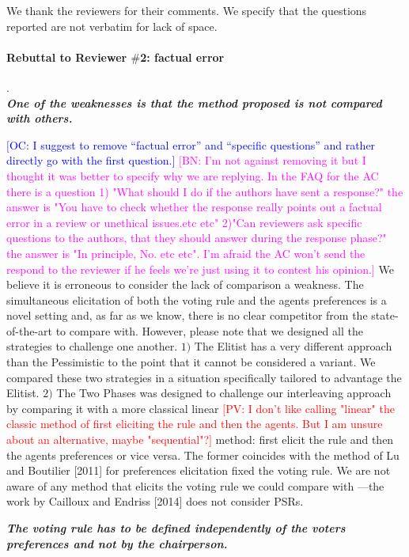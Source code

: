 \documentclass{article}
\newcommand{\commentOC}[1]{\textcolor{blue}{\small$\big[$OC: #1$\big]$}}
\newcommand{\commentBN}[1]{\textcolor{magenta}{\small$\big[$BN: #1$\big]$}}
\newcommand{\commentPV}[1]{\textcolor{red}{\small$\big[$PV: #1$\big]$}}
\begin{document}
\addtocounter{pagecount}{-4}

	We thank the reviewers for their comments. We specify that the questions reported are not verbatim for lack of space. 
\paragraph{Rebuttal to Reviewer $\#$2: factual error}.\\
\textit{\textbf{One of the weaknesses is that the method proposed is not compared with others.}}

\commentOC{I suggest to remove “factual error” and “specific questions” and rather directly go with the first question.} \commentBN{I'm not against removing it but I thought it was better to specify why we are replying. In the FAQ for the AC there is a question 1) "What should I do if the authors have sent a response?" the answer is "You have to check whether the response really points out a factual error in a review or unethical issues.etc etc" 2)"Can reviewers ask specific questions to the authors, that they should answer during the response phase?" the answer is "In principle, No. etc etc". I'm afraid the AC won't send the respond to the reviewer if he feels we're just using it to contest his opinion.}
We believe it is erroneous to consider the lack of comparison a weakness. The simultaneous elicitation of both the voting rule and the agents preferences is a novel setting and, as far as we know, there is no clear competitor from the state-of-the-art to compare with. However, please note that we designed all the strategies to challenge one another. $1)$ The Elitist has a very different approach than the Pessimistic to the point that it cannot be considered a variant. We compared these two strategies in a situation specifically tailored to advantage the Elitist. $2)$ The Two Phases was designed to challenge our interleaving approach by comparing it with a more classical linear \commentPV{I don't like calling "linear" the classic method of first eliciting the rule and then the agents. But I am unsure about an alternative, maybe "sequential"?} method: first elicit the rule and then the agents preferences or vice versa. The former coincides with the method of Lu and Boutilier [2011] for preferences elicitation fixed the voting rule.
We are not aware of any method that elicits the voting rule we could compare with —the work by Cailloux and Endriss [2014] does not consider PSRs.

\textit{\textbf{The voting rule has to be defined independently of the voters preferences and not by the chairperson.}}
\end{document}

